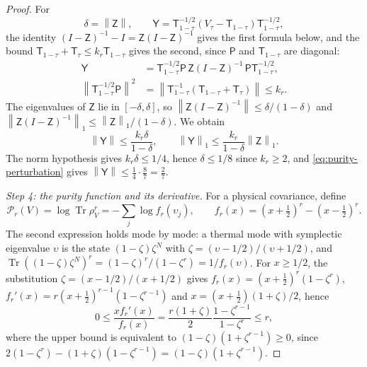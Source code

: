 \documentclass[11pt]{amsart}
\numberwithin{equation}{section}
\theoremstyle{definition}
\newcommand{\Tr}{\operatorname{Tr}}
\newcommand{\norm}[1]{\left\|#1\right\|}
\begin{document}
\begin{proof}
For
\[
 \delta=\norm{\mathsf Z},\qquad
 \mathsf Y=\mathsf T_{1-\tau}^{-1/2}(V_\tau-\mathsf T_{1-\tau})\mathsf T_{1-\tau}^{-1/2},
\]
the identity \((I-\mathsf Z)^{-1}-I=\mathsf Z(I-\mathsf Z)^{-1}\) gives
the first formula below, and the bound
\(\mathsf T_{1-\tau}+\mathsf T_\tau\le k_r\mathsf T_{1-\tau}\) gives the second, since
\(\mathsf P\) and \(\mathsf T_{1-\tau}\) are diagonal:
\begin{align*}
 \mathsf Y
 &=\mathsf T_{1-\tau}^{-1/2}\mathsf P\,\mathsf Z(I-\mathsf Z)^{-1}\,
   \mathsf P\mathsf T_{1-\tau}^{-1/2},\\
 \norm{\mathsf T_{1-\tau}^{-1/2}\mathsf P}^2
 &=\norm{\mathsf T_{1-\tau}^{-1}(\mathsf T_{1-\tau}+\mathsf T_\tau)}
 \le k_r.
\end{align*}
The eigenvalues of \(\mathsf Z\) lie in \([-\delta,\delta]\), so
\(\norm{\mathsf Z(I-\mathsf Z)^{-1}}\le\delta/(1-\delta)\) and
\(\norm{\mathsf Z(I-\mathsf Z)^{-1}}_1\le\norm{\mathsf Z}_1/(1-\delta)\).
We obtain
\begin{equation}
 \norm{\mathsf Y}\le\frac{k_r\delta}{1-\delta},\qquad
 \norm{\mathsf Y}_1\le\frac{k_r}{1-\delta}\norm{\mathsf Z}_1.
 \label{eq:purity-perturbation}
\end{equation}
The norm hypothesis gives \(k_r\delta\le1/4\), hence \(\delta\le1/8\)
since \(k_r\ge2\), and \eqref{eq:purity-perturbation} gives
\(\norm{\mathsf Y}\le\frac14\cdot\frac87=\frac27\).

\smallskip
\emph{Step 4: the purity function and its derivative.} For a physical
covariance, define
\[
 \mathscr P_r(V)=\log\Tr\rho_V^r
 =-\sum_j\log f_r(\upsilon_j),\qquad
 f_r(x)=(x+\tfrac12)^r-(x-\tfrac12)^r.
\]
The second expression holds mode by mode: a thermal mode with
symplectic eigenvalue \(\upsilon\) is the state \((1-\zeta)\zeta^N\)
with \(\zeta=(\upsilon-1/2)/(\upsilon+1/2)\), and
\(\Tr((1-\zeta)\zeta^N)^r=(1-\zeta)^r/(1-\zeta^r)=1/f_r(\upsilon)\).
For \(x\ge1/2\), the substitution
\(\zeta=(x-1/2)/(x+1/2)\) gives \(f_r(x)=(x+\frac12)^r(1-\zeta^r)\),
\(f_r'(x)=r(x+\frac12)^{r-1}(1-\zeta^{r-1})\) and
\(x=(x+\frac12)(1+\zeta)/2\), hence
\[
 0\le\frac{xf_r'(x)}{f_r(x)}
 =\frac{r(1+\zeta)}2
   \frac{1-\zeta^{r-1}}{1-\zeta^r}
 \le r,
\]
where the upper bound is equivalent to \((1-\zeta)(1+\zeta^{r-1})\ge0\),
since \(2(1-\zeta^r)-(1+\zeta)(1-\zeta^{r-1})=(1-\zeta)(1+\zeta^{r-1})\).


\end{proof}
\end{document}
